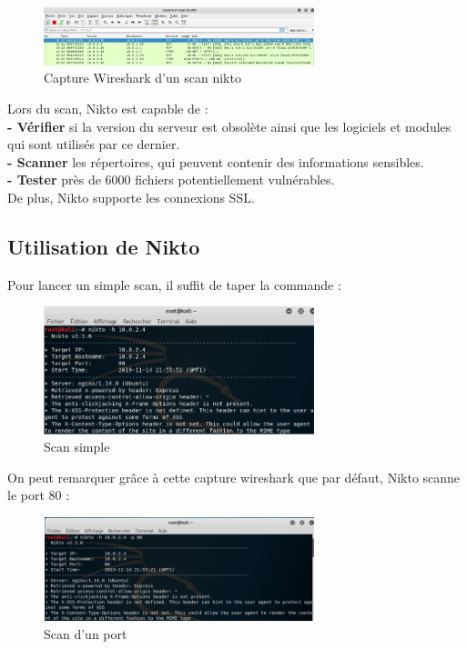 \begin{figure}[htp!]
  \centering
  \setlength\figureheight{7cm}
  \setlength\figurewidth{9cm}
  \includegraphics[width=0.7\textwidth]{oui/Ancien/imangeancien/Nikto/wireshark1.PNG}
  \caption{Capture Wireshark d'un scan nikto}
  \label{fig:niktowire}
\end{figure}


 Lors du scan, Nikto est capable de :\\
\textbf{- Vérifier} si la version du serveur est obsolète ainsi que les logiciels et     modules qui sont utilisés par ce dernier. \\   
\textbf{- Scanner} les répertoires, qui peuvent contenir des informations sensibles.\\
\textbf{- Tester} près de 6000 fichiers potentiellement vulnérables.\\
De plus, Nikto supporte les connexions SSL.


\newpage

\subsection{Utilisation de Nikto}

 Pour lancer un simple scan, il suffit de taper la commande :

\begin{figure}[htp!]
  \centering
  \setlength\figureheight{7cm}
  \setlength\figurewidth{9cm}
  \includegraphics[width=0.7\textwidth]{oui/Ancien/imangeancien/Nikto/1.PNG}
  \caption{Scan simple}
  \label{fig:courbe-tikz}
\end{figure}

On peut remarquer grâce à cette capture wireshark que par défaut, Nikto scanne le port 80 :

\begin{figure}[htp!]
  \centering
  \setlength\figureheight{7cm}
  \setlength\figurewidth{9cm}
  \includegraphics[width=0.7\textwidth]{oui/Ancien/imangeancien/Nikto/2.PNG}
  \caption{Scan d'un port}
  \label{fig:courbe-tikz}
\end{figure}

